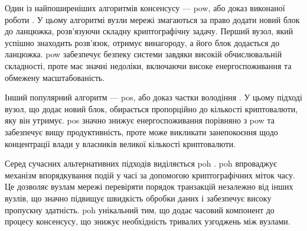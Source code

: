\documentclass[14pt]{extreport}
\begin{document}
  Один із найпоширеніших алгоритмів консенсусу — \gls{pow}, або доказ виконаної роботи \cite{pow}. У цьому алгоритмі вузли мережі змагаються за право додати новий блок до ланцюжка, розв'язуючи складну криптографічну задачу. Перший вузол, який успішно знаходить розв'язок, отримує винагороду, а його блок додається до ланцюжка. \gls{pow} забезпечує безпеку системи завдяки високій обчислювальній складності, проте має значні недоліки, включаючи високе енергоспоживання та обмежену масштабованість.

  Інший популярний алгоритм — \gls{pos}, або доказ частки володіння \cite{pos}. У цьому підході вузол, що додає новий блок, обирається пропорційно до кількості криптовалюти, яку він утримує. \gls{pos} значно знижує енергоспоживання порівняно з \gls{pow} та забезпечує вищу продуктивність, проте може викликати занепокоєння щодо концентрації влади у власників великої кількості криптовалюти.

  Серед сучасних альтернативних підходів виділяється \gls{poh} \cite{poh}. \gls{poh} впроваджує механізм впорядкування подій у часі за допомогою криптографічних міток часу. Це дозволяє вузлам мережі перевіряти порядок транзакцій незалежно від інших вузлів, що значно підвищує швидкість обробки даних і забезпечує високу пропускну здатність. \gls{poh} унікальний тим, що додає часовий компонент до процесу консенсусу, що знижує необхідність тривалих узгоджень між вузлами.

  \begin{table}[H]
  \caption{\\\centering\textbf{Порівняння алгоритмів консенсусу}}
  \label{tab:consensus_comparison}
  \end{table}
  
\end{document}
